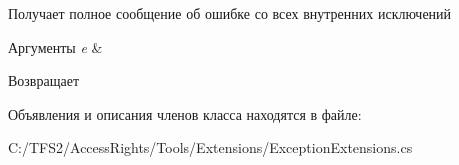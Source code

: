 Получает полное сообщение об ошибке со всех внутренних исключений 


\begin{DoxyParams}{Аргументы}
{\em e} & \\
\hline
\end{DoxyParams}
\begin{DoxyReturn}{Возвращает}

\end{DoxyReturn}


Объявления и описания членов класса находятся в файле\+:\begin{DoxyCompactItemize}
\item 
C\+:/\+T\+F\+S2/\+Access\+Rights/\+Tools/\+Extensions/Exception\+Extensions.\+cs\end{DoxyCompactItemize}
